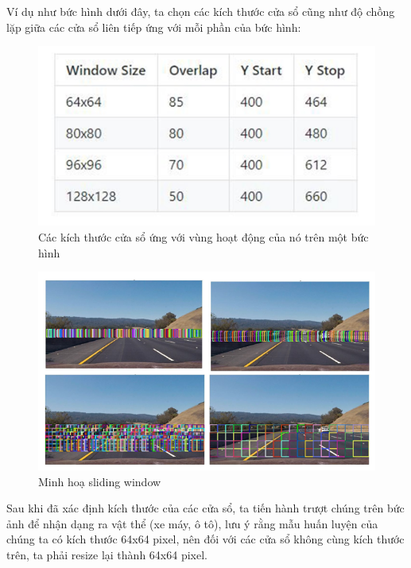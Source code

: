 \documentclass[10pt,conference,a4paper]{IEEEtran}
\makeatletter
\def\ScaleIfNeeded{\ifdim\Gin@nat@width>\linewidth\linewidth\else\Gin@nat@width\fi}
\makeatother
\begin{document}
Ví dụ như bức hình dưới đây, ta chọn các kích thước cửa sổ cũng như độ chồng lặp giữa các cửa sổ liên tiếp ứng với mỗi phần của bức hình:
\begin{figure}[ht]
	\centering
	\includegraphics[width=\ScaleIfNeeded]{"window sizes"}
	\caption{Các kích thước cửa sổ ứng với vùng hoạt động của nó trên một bức hình}
	\label{fig:window-sizes}
\end{figure}
\begin{figure}[ht]
	\centering
	\includegraphics[width=\ScaleIfNeeded]{"sliding window"}
	\caption{Minh hoạ sliding window}
	\label{fig:sliding-window}
\end{figure}

Sau khi đã xác định kích thước của các cửa sổ, ta tiến hành trượt chúng trên bức ảnh để nhận dạng ra vật thể (xe máy, ô tô), lưu ý rằng mẫu huấn luyện của chúng ta có kích thước 64x64 pixel, nên đối với các cửa sổ không cùng kích thước trên, ta phải resize lại thành 64x64 pixel.
\end{document}
